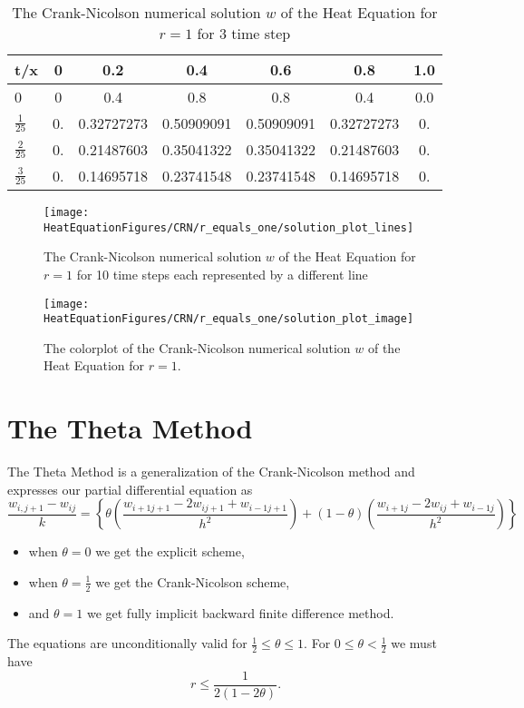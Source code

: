 \begin{example}
\begin{center}
\begin{table}[H]
 \caption{The Crank-Nicolson numerical solution $w$ of the Heat Equation for $r=1$ for 3 time step}
 \centering
\begin{tabular}{l|cccccc}
t/x&0&0.2&0.4&0.6&0.8&1.0\\ \hline
0&0&0.4&0.8&0.8&0.4&0.0\\
$\frac{1}{25}$&0.  &        0.32727273&  0.50909091 & 0.50909091&  0.32727273&  0.\\
$\frac{2}{25}$&0.      &    0.21487603 & 0.35041322 & 0.35041322&  0.21487603 & 0.\\

$\frac{3}{25}$&0.    &      0.14695718&  0.23741548  &0.23741548&  0.14695718&  0. 
\end{tabular}
\end{table}
\end{center}

\begin{figure}[H]
  \caption{The Crank-Nicolson numerical solution $w$ of the Heat Equation for $r=1$ for 10 time steps each represented by a different line}
  \centering
    \texttt{[image: HeatEquationFigures/CRN/r\_equals\_one/solution\_plot\_lines]}
\end{figure}


\begin{figure}[H]
  \caption{The colorplot of the Crank-Nicolson numerical solution $w$ of the Heat Equation for $r=1$.}
  \centering
    \texttt{[image: HeatEquationFigures/CRN/r\_equals\_one/solution\_plot\_image]}
\end{figure}

\end{example}




\section{The Theta Method}
The Theta Method is a generalization of the Crank-Nicolson method and expresses
our partial differential equation as
\begin{equation}
\label{2 theta}
\frac{w_{i,j+1}-w_{ij}}{k}=\left\{\theta\left(\frac{w_{i+1j+1}-2w_{ij+1}+w_{i-1j+1}}{h^2}\right)+
(1-\theta)\left(
\frac{w_{i+1j}-2w_{ij}+w_{i-1j}}{h^2}
\right)
\right\}
\end{equation}
\begin{itemize}
\item
when $\theta=0$ we get the explicit scheme,
\item
when $\theta=\frac{1}{2}$ we get the Crank-Nicolson scheme,
\item
and $\theta=1$ we get fully implicit backward finite difference method.
\end{itemize}
The equations are unconditionally valid for $\frac{1}{2}\leq \theta \leq 1$.
For  $0\leq \theta < \frac{1}{2}$ we must have
\[r\leq \frac{1}{2(1-2\theta)}. \]
